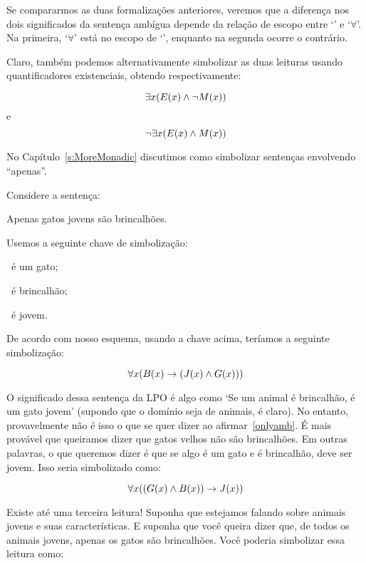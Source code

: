 Se compararmos as duas formalizações anteriores, veremos que a diferença nos dois significados da sentença ambígua depende da relação de escopo entre `\enot' e `$\forall$'. Na primeira, `$\forall$' está no escopo de `\enot', enquanto na segunda ocorre o contrário.

Claro, também podemos alternativamente simbolizar as duas leituras usando quantificadores existenciais, obtendo respectivamente:

\begin{center}
$$\exists x (\mathord{E}(x) \wedge \neg \mathord{M}(x))$$
e
$$\neg \exists x (\mathord{E}(x) \wedge \mathord{M}(x))$$
\end{center}

No Capítulo~\ref{s:MoreMonadic} discutimos como simbolizar sentenças envolvendo ``apenas''.

Considere a sentença:

\begin{earg}
    \item [\ex{onlyamb}] Apenas gatos jovens são brincalhões.
\end{earg}

Usemos a seguinte chave de simbolização:

\begin{ekey}
    \item [\atom{G}{x}] ~é um gato;
    \item [\atom{B}{x}] ~é brincalhão;
    \item [\atom{J}{x}] ~é jovem.
\end{ekey}

De acordo com nosso esquema, usando a chave acima, teríamos a seguinte simbolização:

$$\forall x (\mathord{B}(x) \rightarrow (\mathord{J}(x) \wedge \mathord{G}(x)))$$

O significado dessa sentença da LPO é algo como `Se um animal é brincalhão, é um gato jovem' (supondo que o domínio seja de animais, é claro). No entanto, provavelmente não é isso o que se quer dizer ao afirmar~\ref{onlyamb}. É mais provável que queiramos dizer que gatos velhos não são brincalhões. Em outras palavras, o que queremos dizer é que se algo é um gato e é brincalhão, deve ser jovem. Isso seria simbolizado como:

$$\forall x ((\mathord{G}(x) \wedge \mathord{B}(x)) \rightarrow \mathord{J}(x))$$

Existe até uma terceira leitura! Suponha que estejamos falando sobre animais jovens e suas características. E suponha que você queira dizer que, de todos os animais jovens, apenas os gatos são brincalhões. Você poderia simbolizar essa leitura como:


